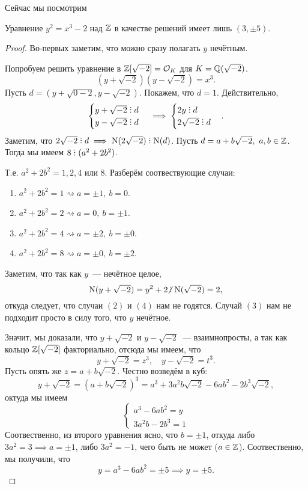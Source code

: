 	Сейчас мы посмотрим 
	\begin{statement} 
		Уравнение $y^2 = x^3 - 2$ над $\mathbb{Z}$ в качестве решений имеет лишь $(3, \pm 5)$.
	\end{statement}
	\begin{proof}
		Во-первых заметим, что можно сразу полагать $y$ нечётным. 

		Попробуем решить уравнение в $\mathbb{Z}[\sqrt{-2}] = \mathcal{O}_{K}$ для $K = \mathbb{Q}(\sqrt{-2})$. 
		\[
			(y + \sqrt{-2})(y - \sqrt{-2}) = x^3.
		\]
		Пусть $d = (y + \sqrt{0-2}, y - \sqrt{-2})$. Покажем, что $d = 1$. Действительно, 
		\[
			\begin{cases} y + \sqrt{-2} \divby d \\ y - \sqrt{-2} \divby d \end{cases}	\implies \begin{cases} 2y \divby d \\ 2\sqrt{-2} \divby d \end{cases}.
		\]	
		Заметим, что $2\sqrt{-2} \divby d \implies \Nm(2 \sqrt{-2}) \divby \Nm(d)$. Пусть $d = a + b \sqrt{-2}, \ a, b \in \mathbb{Z}$. Тогда  мы имеем $8 \divby (a^2 + 2b^2)$. 
		
		Т.е. $a^2 + 2b^2 = 1, 2, 4$ или 8. Разберём соотвествующие случаи: 
		\begin{enumerate}
			\item $a^2 + 2b^2 = 1  \rightsquigarrow a = \pm 1,\  b = 0$. 

			\item $a^2 + 2b^2 = 2 \rightsquigarrow a = 0, \ b = \pm 1$. 

			\item $a^2 + 2b^2 = 4 \rightsquigarrow a = \pm 2, \ b = \pm 0$. 

			\item $a^2 + 2b^2 = 8 \rightsquigarrow a = \pm 0, \ b = \pm 2$. 
		\end{enumerate}

		Заметим, что так как $y$~--- нечётное целое, 
		\[
			\Nm(y + \sqrt{-2}) = y^2 + 2 \notdivby \Nm(\sqrt{-2}) = 2,
		\]
		откуда следует, что случаи $(2)$ и $(4)$ нам не годятся. Случай $(3)$ нам не подходит просто в силу того, что $y$ нечётное. 

		Значит, мы доказали, что $y + \sqrt{-2}$ и $y - \sqrt{-2}$~--- взаимнопросты, а так как кольцо $\mathbb{Z}[\sqrt{-2}]$ факториально, отсюда мы имеем, что 
		\[
			y + \sqrt{-2} = z^3, \quad y - \sqrt{-2} = t^3. 
		\]
		Пусть опять же $z = a + b \sqrt{-2}$. Честно возведём в куб: 
		\[
			y + \sqrt{-2} = (a + b\sqrt{-2})^3 = a^3 + 3a^2 b \sqrt{-2} - 6 a b^2 - 2 b^3 \sqrt{-2},
		\]
		октуда мы имеем 
		\[
			\begin{cases} a^3 - 6ab^2 = y \\ 3a^2 b - 2b^3 = 1 \end{cases}
		\]
		Соотвественно, из второго уравнения ясно, что $b = \pm1$, откуда либо $3a^2 = 3 \implies a = \pm 1$, либо $3a^2 = -1$, чего быть не может ($a \in \mathbb{Z}$). Соотвественно, мы получили, что 
		\[
			y = a^3 - 6ab^2 = \pm 5 \implies y = \pm 5.
		\]
	\end{proof}

	






